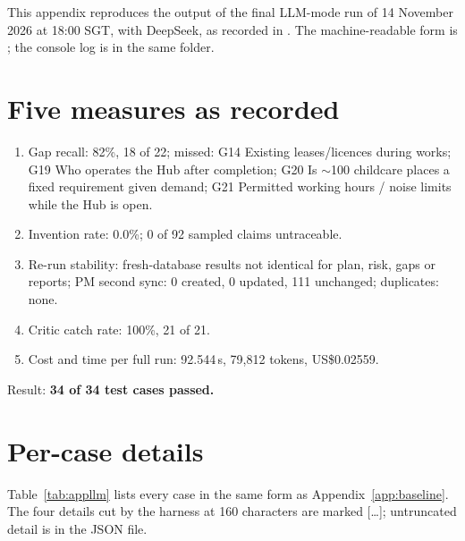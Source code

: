This appendix reproduces the output of the final LLM-mode run of 14 November 2026 at 18:00 SGT, with DeepSeek, as recorded in . The machine-readable form is ; the console log is  in the same folder.

\section{Five measures as recorded}
\begin{enumerate}
  \item Gap recall: 82\%, 18 of 22; missed: G14 Existing leases/licences during works; G19 Who operates the Hub after completion; G20 Is $\sim$100 childcare places a fixed requirement given demand; G21 Permitted working hours / noise limits while the Hub is open.
  \item Invention rate: 0.0\%; 0 of 92 sampled claims untraceable.
  \item Re-run stability: fresh-database results not identical for plan, risk, gaps or reports; PM second sync: 0 created, 0 updated, 111 unchanged; duplicates: none.
  \item Critic catch rate: 100\%, 21 of 21.
  \item Cost and time per full run: 92.544\,s, 79,812 tokens, US\$0.02559.
\end{enumerate}
Result: \textbf{34 of 34 test cases passed.}

\section{Per-case details}
Table~\ref{tab:appllm} lists every case in the same form as Appendix~\ref{app:baseline}. The four details cut by the harness at 160 characters are marked [\ldots]; untruncated detail is in the JSON file.

